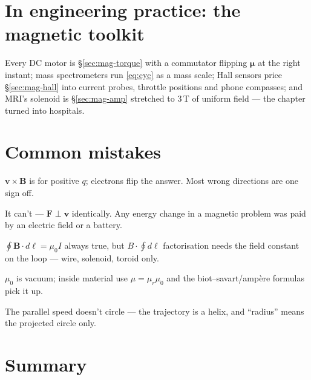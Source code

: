 \section{In engineering practice: the magnetic toolkit}\label{sec:mag-eng}

Every DC motor is \S\ref{sec:mag-torque} with a commutator flipping
$\boldsymbol\mu$ at the right instant; mass spectrometers run
\eqref{eq:cyc} as a mass scale; Hall sensors price \S\ref{sec:mag-hall}
into current probes, throttle positions and phone compasses; and
MRI's solenoid is \S\ref{sec:mag-amp} stretched to 3\,T of uniform
field --- the chapter turned into hospitals.

\section{Common mistakes}\label{sec:mag-mistakes}

\begin{tripwire}
$\mathbf v\times\mathbf B$ is for positive $q$; electrons flip the
answer. Most wrong directions are one sign off.
\end{tripwire}
\begin{tripwire}
It can't --- $\mathbf F\perp\mathbf v$ identically. Any energy change
in a magnetic problem was paid by an electric field or a battery.
\end{tripwire}
\begin{tripwire}
$\oint\mathbf B\cdot d\boldsymbol\ell=\mu_0I$ always true, but
$B\cdot\oint d\ell$ factorisation needs the field constant on the loop
--- wire, solenoid, toroid only.
\end{tripwire}
\begin{tripwire}[$\mu_0$ vs permeability]
$\mu_0$ is vacuum; inside material use $\mu=\mu_r\mu_0$ and the
biot--savart/amp\`ere formulas pick it up.
\end{tripwire}
\begin{tripwire}
The parallel speed doesn't circle --- the trajectory is a helix, and
``radius'' means the projected circle only.
\end{tripwire}

\section{Summary}\label{sec:mag-summary}

